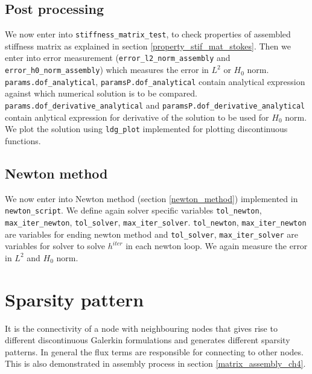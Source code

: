 \documentclass[a4paper,openany]{book}
\begin{document}
\subsection{Post processing}

We now enter into \verb|stiffness_matrix_test|, to check properties of assembled stiffness matrix as explained in section \ref{property_stif_mat_stokes}. Then we enter into error measurement (\verb|error_l2_norm_assembly| and \verb|error_h0_norm_assembly|) which measures the error in $L^2$ or $H_0$ norm. \verb|params.dof_analytical|, \verb|paramsP.dof_analytical| contain analytical expression against which numerical solution is to be compared. \verb|params.dof_derivative_analytical| and \verb|paramsP.dof_derivative_analytical| contain anlytical expression for derivative of the solution to be used for $H_0$ norm. We plot the solution using  \verb|ldg_plot| implemented for plotting discontinuous functions. \\

\subsection{Newton method}

We now enter into Newton method (section \ref{newton_method}) implemented in \verb|newton_script|. We define again solver specific variables \verb|tol_newton|, \verb|max_iter_newton|, \verb|tol_solver|, \verb|max_iter_solver|. \verb|tol_newton|, \verb|max_iter_newton| are variables for ending newton method and \verb|tol_solver|, \verb|max_iter_solver| are variables for solver to solve $h^{iter}$ in each newton loop. We again measure the error in $L^2$ and $H_0$ norm.\\

\section{Sparsity pattern}

It is the connectivity of a node with neighbouring nodes that gives rise to different discontinuous Galerkin formulations and generates different sparsity patterns. In general the flux terms are responsible for connecting to other nodes. This is also demonstrated in assembly process in section \ref{matrix_assembly_ch4}. \\
\end{document}
